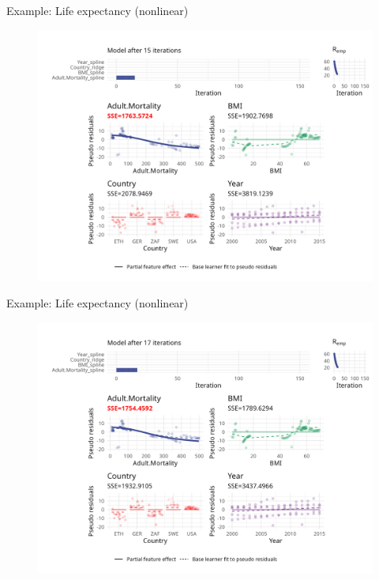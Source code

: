 \begin{frame}{Example: Life expectancy (nonlinear)}
	\begin{figure}
		\centering
		\includegraphics[width=\textwidth]{figures/cwb-anim/fig-iter-0015.png}
	\end{figure}
	\addtocounter{framenumber}{-1}
\end{frame}


\begin{frame}{Example: Life expectancy (nonlinear)}
	\begin{figure}
		\centering
		\includegraphics[width=\textwidth]{figures/cwb-anim/fig-iter-0017.png}
	\end{figure}
	\addtocounter{framenumber}{-1}
\end{frame}



